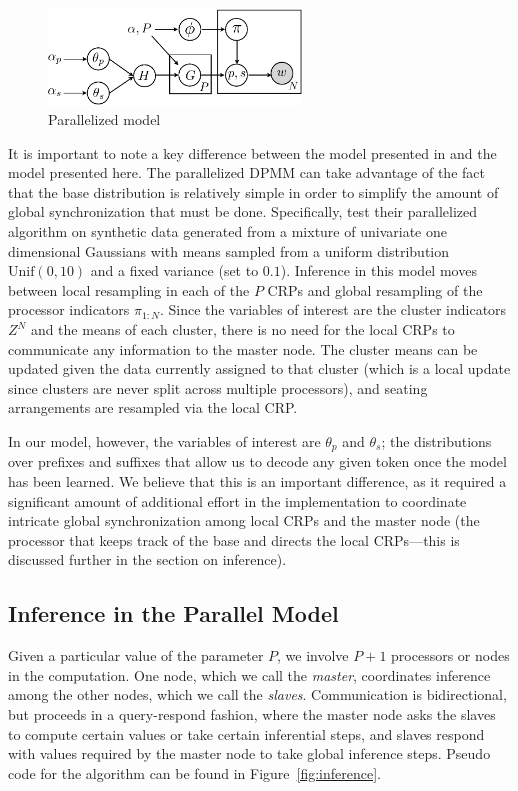 \begin{figure}[h]
  \centering
  \includegraphics[width=0.6\textwidth]{fig/v3}
  \caption{Parallelized model}
  \label{fig:v3}
\end{figure}

It is important to note a key difference between the model presented
in \cite{williamson2013} and the model presented here. The
parallelized DPMM can take advantage of the fact that the base
distribution is relatively simple in order to simplify the amount of
global synchronization that must be done. Specifically,
\cite{williamson2013} test their parallelized algorithm on synthetic
data generated from a mixture of univariate one dimensional Gaussians
with means sampled from a uniform distribution $\text{Unif}(0, 10)$
and a fixed variance (set to $0.1$). Inference in this model moves
between local resampling in each of the $P$ CRPs and global resampling
of the processor indicators $\pi_{1:N}$. Since the variables of
interest are the cluster indicators $Z^N$ and the means of each
cluster, there is no need for the local CRPs to communicate any
information to the master node. The cluster means can be updated given
the data currently assigned to that cluster (which is a local update
since clusters are never split across multiple processors), and
seating arrangements are resampled via the local CRP.

In our model, however, the variables of interest are $\theta_p$ and
$\theta_s$; the distributions over prefixes and suffixes that allow us
to decode any given token once the model has been learned. We believe
that this is an important difference, as it required a significant
amount of additional effort in the implementation to coordinate
intricate global synchronization among local CRPs and the master node
(the processor that keeps track of the base and directs the local
CRPs---this is discussed further in the section on inference).

\subsection{Inference in the Parallel Model}

Given a particular value of the parameter $P$, we involve $P + 1$
processors or nodes in the computation. One node, which we call the
\textit{master}, coordinates inference among the other nodes, which we
call the \textit{slaves}. Communication is bidirectional, but proceeds
in a query-respond fashion, where the master node asks the slaves to
compute certain values or take certain inferential steps, and slaves
respond with values required by the master node to take global
inference steps. Pseudo code for the algorithm can be found in
Figure~\ref{fig:inference}.

